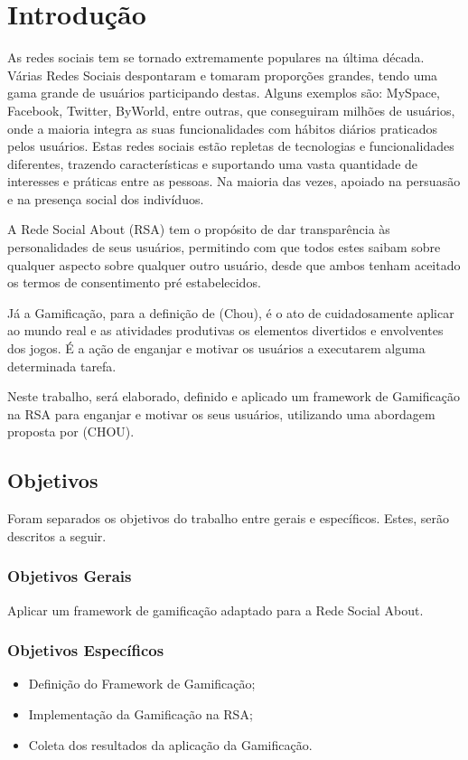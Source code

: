 \chapter[Introdução]{Introdução}
As redes sociais tem se tornado extremamente populares na última década.
Várias
Redes Sociais despontaram e tomaram proporções grandes, tendo uma gama grande
de usuários participando destas. Alguns exemplos são: MySpace, Facebook, Twitter,
ByWorld, entre outras, que conseguiram milhões de usuários, onde a maioria integra
as suas funcionalidades com hábitos diários praticados pelos usuários.
Estas redes sociais estão repletas de tecnologias e funcionalidades diferentes,
trazendo características e suportando uma vasta quantidade de interesses e práticas
entre as pessoas. Na maioria das vezes, apoiado na persuasão e na presença social
dos indivíduos.

A Rede Social About (RSA) tem o propósito de dar transparência às personalidades de seus usuários, permitindo com que todos
estes saibam sobre qualquer aspecto sobre qualquer outro usuário, desde que ambos tenham aceitado os
termos de consentimento pré estabelecidos.

Já a Gamificação, para a definição de (Chou),  é o ato de cuidadosamente aplicar ao mundo
real e as atividades produtivas os elementos divertidos e envolventes dos jogos.
É a ação de enganjar e motivar os usuários a executarem alguma determinada
tarefa. 

Neste trabalho, será elaborado, definido e aplicado um framework de Gamificação na RSA 
para enganjar e motivar os seus usuários, utilizando uma abordagem proposta por (CHOU).


\section{Objetivos}
Foram separados os objetivos do trabalho entre gerais e específicos. Estes, serão
descritos a seguir.
\subsection{Objetivos Gerais}
Aplicar um framework de  gamificação adaptado para a Rede Social About.
\subsection{Objetivos Específicos}
\begin{itemize}
    \item Definição do Framework de Gamificação;
    \item Implementação da Gamificação na RSA;
    \item Coleta dos resultados da aplicação da Gamificação.
\end{itemize}
